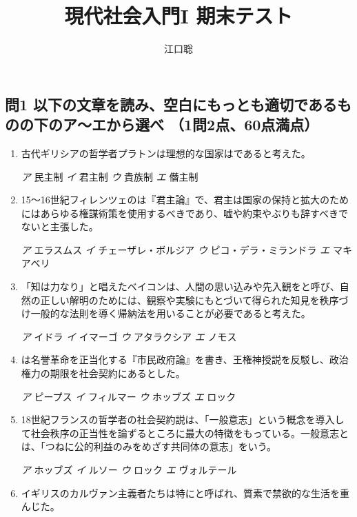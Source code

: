 \documentclass[uplatex,dvipdfmx]{jsarticle}
\author{江口聡}
\title{現代社会入門I 期末テスト}
\newcommand{\sentakusi}[4]{
\hspace{.3zw}
\emph{ア}\hspace{1zw} #1 \hspace{2zw} \emph{イ} \hspace{1zw}#2 \hspace{2zw}\emph{ウ}\hspace{1zw} #3 \hspace{2zw}\emph{エ}\hspace{1zw} #4

}
\begin{document}
\maketitle

\subsection*{問1 以下の文章を読み、空白にもっとも適切であるものの下のア〜エから選べ （1問2点、60点満点）}

\begin{enumerate}

\setlength{\parskip}{.9zw}
\setlength{\itemsep}{.9zw}


\item   古代ギリシアの哲学者プラトンは理想的な国家はであると考えた。


  \sentakusi
{民主制}
{君主制}
{貴族制}
{僭主制}


\item   15〜16世紀フィレンツェのは『君主論』で、君主は国家の保持と拡大のためにはあらゆる権謀術策を使用するべきであり、嘘や約束やぶりも辞すべきでないと主張した。

\sentakusi
{エラスムス}
{チェーザレ・ボルジア}
{ピコ・デラ・ミランドラ}
{マキアベリ}

\item 「知は力なり」と唱えたベイコンは、人間の思い込みや先入観をと呼び、自然の正しい解明のためには、観察や実験にもとづいて得られた知見を秩序づけ一般的な法則を導く帰納法を用いることが必要であると考えた。

\sentakusi
{イドラ}
{イマーゴ}
{アタラクシア}
{ノモス}


\item {}は名誉革命を正当化する『市民政府論』を書き、王権神授説を反駁し、政治権力の期限を社会契約にあるとした。

\sentakusi
{ピープス}
{フィルマー}
{ホッブズ}
{ロック}


\item   18世紀フランスの哲学者の社会契約説は、「一般意志」という概念を導入して社会秩序の正当性を論ずるところに最大の特徴をもっている。一般意志とは、「つねに公的利益のみをめざす共同体の意志」をいう。

\sentakusi
{ホッブズ}
{ルソー}
{ロック}
{ヴォルテール}


\item   イギリスのカルヴァン主義者たちは特にと呼ばれ、質素で禁欲的な生活を重んじた。


\end{enumerate}
\end{document}
